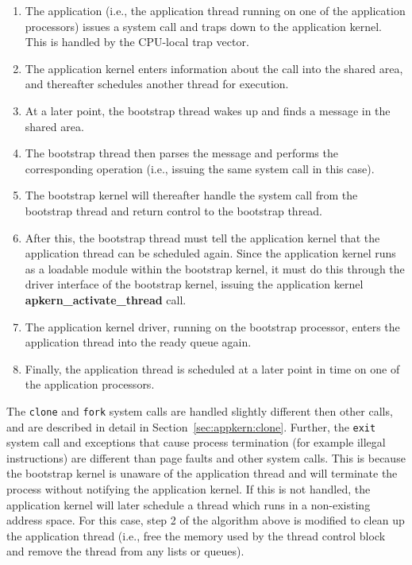 \begin{enumerate}
\item The application (i.e., the application thread running on one of the
  application processors) issues a system call and traps down to the
  application kernel. This is handled by the CPU-local trap vector.

\item The application kernel enters information about the call into the shared
  area, and thereafter schedules another thread for execution.
\item At a later point, the bootstrap thread wakes up and finds a message in
  the shared area.
\item The bootstrap thread then parses the message and performs the
  corresponding operation (i.e., issuing the same system call in this case).
\item The bootstrap kernel will thereafter handle the system call from the bootstrap
  thread and  return control to the bootstrap thread.
\item After this, the bootstrap thread must tell the application kernel that
  the application thread can be scheduled again. Since the application kernel
  runs as a loadable module within the bootstrap kernel, it must do this
  through the driver interface of the bootstrap kernel, issuing the
  application kernel \textbf{apkern\_activate\_thread} call.
\item The application kernel driver, running on the bootstrap processor,
  enters the application thread into the ready queue again.
\item Finally, the application thread is scheduled at a later point in time on
  one of the application processors.
\end{enumerate}

The \texttt{clone} and \texttt{fork} system calls are handled slightly
different then other calls, and are described in detail in
Section~\ref{sec:appkern:clone}.  Further, the \texttt{exit} system call and
exceptions that cause process termination (for example illegal instructions)
are different than page faults and other system calls. This is because the
bootstrap kernel is unaware of the application thread and will terminate the
process without notifying the application kernel. If this is not handled, the
application kernel will later schedule a thread which runs in a non-existing
address space. For this case, step 2 of the algorithm above is modified to
clean up the application thread (i.e., free the memory used by the thread
control block and remove the thread from any lists or queues).

